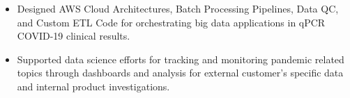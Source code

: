 \documentclass[10pt,a4paper]{altacv}
\begin{document}
\tagline{}

%

\begin{fullwidth}
\makecvheader
\end{fullwidth}

%





\begin{itemize}
    \item   \small{Designed AWS Cloud Architectures, Batch Processing Pipelines, Data QC, and Custom ETL Code for orchestrating big data applications in qPCR COVID-19 clinical results.}
    \item   \small{Supported data science efforts for tracking and monitoring pandemic related topics through dashboards and analysis for external customer's specific data and internal product investigations.}
\end{itemize}

\medskip


\end{document}
